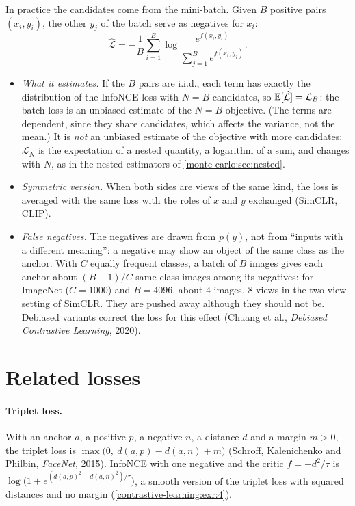 \begin{notechapter}
In practice the candidates come from the mini-batch. Given $B$ positive pairs $(x_i, y_i)$, the other $y_j$ of the
batch serve as negatives for $x_i$:
\[
  \hat{\mathcal L} = -\frac1B\sum_{i=1}^B\log\frac{e^{f(x_i, y_i)}}{\sum_{j=1}^Be^{f(x_i, y_j)}} .
\]
\begin{itemize}
  \item \emph{What it estimates.} If the $B$ pairs are i.i.d., each term has exactly the distribution of the InfoNCE
        loss with $N = B$ candidates, so $\mathbb{E}[\hat{\mathcal L}] = \mathcal L_B$: the batch loss is an unbiased estimate of the $N = B$ objective. (The
        terms are dependent, since they share candidates, which affects the variance, not the
        mean.) It is \emph{not} an unbiased estimate of the objective with more candidates: $\mathcal L_N$ is the
        expectation of a nested quantity, a logarithm of a sum, and changes with $N$, as in the nested
        estimators of \cref{monte-carlo:sec:nested}.
  \item \emph{Symmetric version.} When both sides are views of the same kind, the loss is averaged with
        the same loss with the roles of $x$ and $y$ exchanged (SimCLR, CLIP).
  \item \emph{False negatives.} The negatives are drawn from $p(y)$, not from ``inputs with a different
        meaning'': a negative may show an object of the same class as the anchor. With $C$
        equally frequent classes, a batch of $B$ images gives each anchor about $(B - 1)/C$ same-class
        images among its negatives: for ImageNet ($C = 1000$) and $B = 4096$, about $4$ images, $8$ views in the
        two-view setting of SimCLR. They are pushed away although they should not be. Debiased
        variants correct the loss for this effect (Chuang et al., \emph{Debiased Contrastive
        Learning}, 2020).
\end{itemize}

\section{Related losses}\label{contrastive-learning:sec:related}

\paragraph{Triplet loss.} With an anchor $a$, a positive $p$, a negative $n$, a distance $d$ and a margin $m > 0$, the
triplet loss is $\max\bigl(0,\ d(a, p) - d(a, n) + m\bigr)$ (Schroff, Kalenichenko and Philbin, \emph{FaceNet}, 2015). InfoNCE with one
negative and the critic $f = -d^2/\tau$ is $\log\bigl(1 + e^{(d(a,p)^2 - d(a,n)^2)/\tau}\bigr)$, a smooth version of the triplet loss with squared distances
and no margin (\cref{contrastive-learning:exr:4}).


\end{notechapter}
